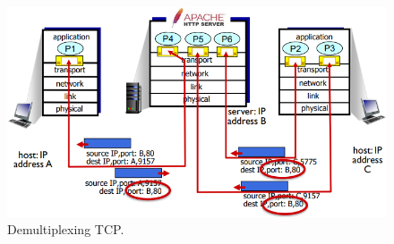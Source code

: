 \begin{figure}[h]
    \centering
    \includegraphics[scale=0.48]{Immagini/DemultiplexingTCP.png}
    \caption{Demultiplexing TCP.}
\end{figure}